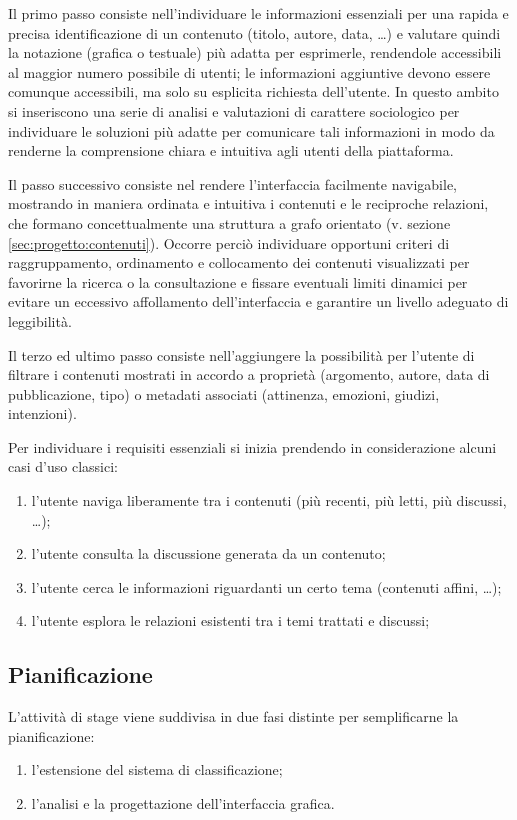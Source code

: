 \documentclass[11pt,a4paper,headsepline,hidelinks]{scrreprt} %
\begin{document}
	Il primo passo consiste nell'individuare le informazioni essenziali per una rapida e precisa identificazione di un contenuto (titolo, autore, data, \ldots) e valutare quindi la notazione (grafica o testuale) più adatta per esprimerle, rendendole accessibili al maggior numero possibile di utenti; le informazioni aggiuntive devono essere comunque accessibili, ma solo su esplicita richiesta dell'utente. In questo ambito si inseriscono una serie di analisi e valutazioni di carattere sociologico per individuare le soluzioni più adatte per comunicare tali informazioni in modo da renderne la comprensione chiara e intuitiva agli utenti della piattaforma.
	
	Il passo successivo consiste nel rendere l'interfaccia facilmente navigabile, mostrando in maniera ordinata e intuitiva i contenuti e le reciproche relazioni, che formano concettualmente una struttura a grafo orientato (v. sezione \ref{sec:progetto:contenuti}). Occorre perciò individuare opportuni criteri di raggruppamento, ordinamento e collocamento dei contenuti visualizzati per favorirne la ricerca o la consultazione e fissare eventuali limiti dinamici per evitare un eccessivo affollamento dell'interfaccia e garantire un livello adeguato di leggibilità.%
	
	Il terzo ed ultimo passo consiste nell'aggiungere la possibilità per l'utente di filtrare i contenuti mostrati in accordo a proprietà (argomento, autore, data di pubblicazione, tipo) o metadati associati (attinenza, emozioni, giudizi, intenzioni).
	
	Per individuare i requisiti essenziali si inizia prendendo in considerazione alcuni casi d'uso classici:
	\begin{enumerate}
	  \item l'utente naviga liberamente tra i contenuti (più recenti, più letti, più discussi, \ldots);
	  \item l'utente consulta la discussione generata da un contenuto;
	  \item l'utente cerca le informazioni riguardanti un certo tema (contenuti affini, \ldots);
	  \item l'utente esplora le relazioni esistenti tra i temi trattati e discussi; %
	\end{enumerate}
	
	\subsection{Pianificazione}
	L'attività di stage viene suddivisa in due fasi distinte per semplificarne la pianificazione:
	\begin{enumerate}
	  \item l'estensione del sistema di classificazione;
	  \item l'analisi e la progettazione dell'interfaccia grafica.
	\end{enumerate}
	
\end{document}

